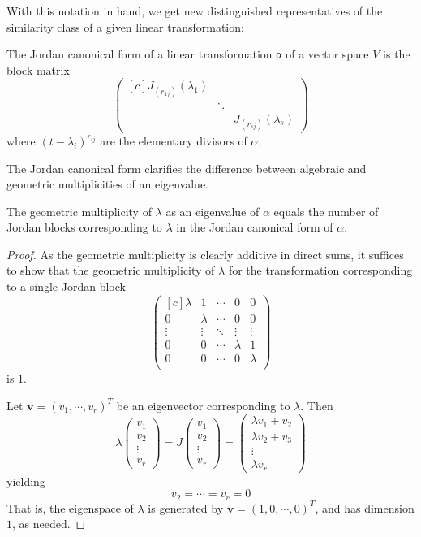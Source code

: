 With this notation in hand, we get new distinguished representatives of the similarity class of a given linear transformation:
\begin{definition}
The Jordan canonical form of a linear transformation α of a vector space $V$ is the block matrix
\[\begin{pmatrix*}[c]
J_{(r_{1j})}(\lambda_1)&&\\
&\ddots&\\
&&J_{(r_{sj})}(\lambda_s)
\end{pmatrix*}\]
where $(t-\lambda_i)^{r_{ij}}$ are the elementary divisors of $\alpha$.
\end{definition}
The Jordan canonical form clarifies the difference between algebraic and geometric multiplicities of an eigenvalue.
\begin{proposition}\label{Jordan geometric multiplicity}
The geometric multiplicity of $\lambda$ as an eigenvalue of $\alpha$ equals the number of Jordan blocks corresponding to $\lambda$ in the Jordan canonical form of $\alpha$.
\end{proposition}
\begin{proof}
As the geometric multiplicity is clearly additive in direct sums, it suffices to show that the geometric multiplicity of $\lambda$ for the transformation corresponding to a single Jordan block
\[\begin{pmatrix*}[c]
\lambda&1&\cdots&0&0\\
0&\lambda&\cdots&0&0\\
\vdots&\vdots&\ddots&\vdots&\vdots\\
0&0&\cdots&\lambda&1\\
0&0&\cdots&0&\lambda\\
\end{pmatrix*}\]
is $1$.\par
Let $\bm{v}=(v_1,\cdots,v_r)^T$ be an eigenvector corresponding to $\lambda$. Then
\[\lambda\begin{pmatrix}
v_1\\
v_2\\
\vdots\\
v_r
\end{pmatrix}=J\begin{pmatrix}
v_1\\
v_2\\
\vdots\\
v_r
\end{pmatrix}=\begin{pmatrix}
\lambda v_1+v_2\\
\lambda v_2+v_3\\
\vdots\\
\lambda v_r
\end{pmatrix}\]
yielding
\[v_2=\cdots=v_r=0\]
That is, the eigenspace of $\lambda$ is generated by $\bm{v}=(1,0,\cdots,0)^T$, and has dimension $1$, as needed.
\end{proof}
